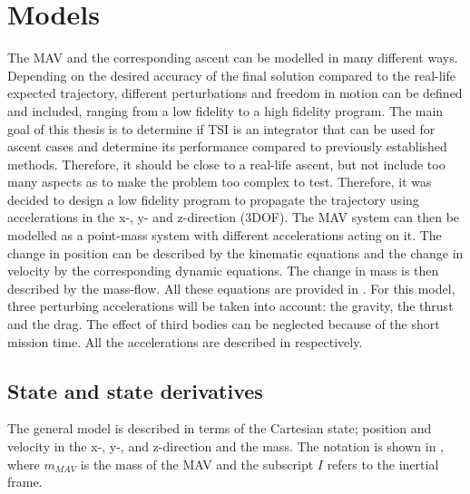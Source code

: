 

\chapter{Models} 
\label{ch:models}
The \ac{MAV} and the corresponding ascent can be modelled in many different ways. Depending on the desired accuracy of the final solution compared to the real-life expected trajectory, different perturbations and freedom in motion can be defined and included, ranging from a low fidelity to a high fidelity program. The main goal of this thesis is to determine if \ac{TSI} is an integrator that can be used for ascent cases and determine its performance compared to previously established methods. Therefore, it should be close to a real-life ascent, but not include too many aspects as to make the problem too complex to test. Therefore, it was decided to design a low fidelity program to propagate the trajectory using accelerations in the x-, y- and z-direction (3DOF). The \ac{MAV} system can then be modelled as a point-mass system with different accelerations acting on it. The change in position can be described by the kinematic equations and the change in velocity by the corresponding dynamic equations. The change in mass is then described by the mass-flow. All these equations are provided in . For this model, three perturbing accelerations will be taken into account: the gravity, the thrust and the drag. The effect of third bodies can be neglected because of the short mission time. All the accelerations are described in  respectively. 

\section{State and state derivatives}
\label{sec:stateAndStateDerivatives}
The general model is described in terms of the Cartesian state; position and velocity in the x-, y-, and z-direction and the mass. The notation is shown in , where $m_{MAV}$ is the mass of the \ac{MAV} and the subscript $I$ refers to the inertial frame.

